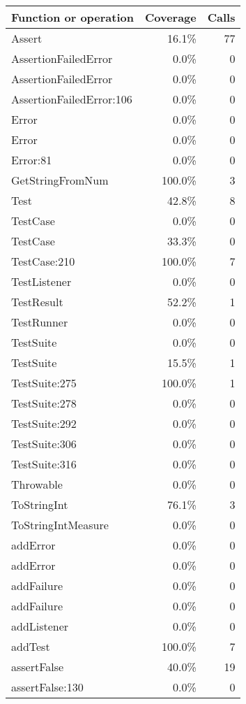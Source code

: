 \documentclass[a4paper]{article}
\begin{document}
\bigskip
\begin{longtable}{|l|r|r|}
\hline
Function or operation & Coverage & Calls \\
\hline
\hline
Assert & 16.1\% & 77 \\
\hline
AssertionFailedError & 0.0\% & 0 \\
\hline
AssertionFailedError & 0.0\% & 0 \\
\hline
AssertionFailedError:106 & 0.0\% & 0 \\
\hline
Error & 0.0\% & 0 \\
\hline
Error & 0.0\% & 0 \\
\hline
Error:81 & 0.0\% & 0 \\
\hline
GetStringFromNum & 100.0\% & 3 \\
\hline
Test & 42.8\% & 8 \\
\hline
TestCase & 0.0\% & 0 \\
\hline
TestCase & 33.3\% & 0 \\
\hline
TestCase:210 & 100.0\% & 7 \\
\hline
TestListener & 0.0\% & 0 \\
\hline
TestResult & 52.2\% & 1 \\
\hline
TestRunner & 0.0\% & 0 \\
\hline
TestSuite & 0.0\% & 0 \\
\hline
TestSuite & 15.5\% & 1 \\
\hline
TestSuite:275 & 100.0\% & 1 \\
\hline
TestSuite:278 & 0.0\% & 0 \\
\hline
TestSuite:292 & 0.0\% & 0 \\
\hline
TestSuite:306 & 0.0\% & 0 \\
\hline
TestSuite:316 & 0.0\% & 0 \\
\hline
Throwable & 0.0\% & 0 \\
\hline
ToStringInt & 76.1\% & 3 \\
\hline
ToStringIntMeasure & 0.0\% & 0 \\
\hline
addError & 0.0\% & 0 \\
\hline
addError & 0.0\% & 0 \\
\hline
addFailure & 0.0\% & 0 \\
\hline
addFailure & 0.0\% & 0 \\
\hline
addListener & 0.0\% & 0 \\
\hline
addTest & 100.0\% & 7 \\
\hline
assertFalse & 40.0\% & 19 \\
\hline
assertFalse:130 & 0.0\% & 0 \\

\end{longtable}
\end{document}

